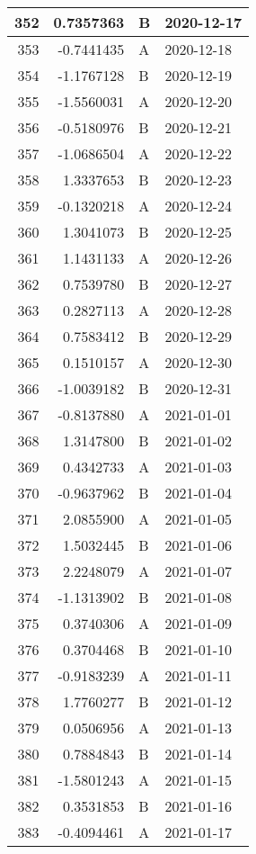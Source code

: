 \begin{tabular}{r|r|l|l}
\hline
352 & 0.7357363 & B & 2020-12-17\\
\hline
353 & -0.7441435 & A & 2020-12-18\\
\hline
354 & -1.1767128 & B & 2020-12-19\\
\hline
355 & -1.5560031 & A & 2020-12-20\\
\hline
356 & -0.5180976 & B & 2020-12-21\\
\hline
357 & -1.0686504 & A & 2020-12-22\\
\hline
358 & 1.3337653 & B & 2020-12-23\\
\hline
359 & -0.1320218 & A & 2020-12-24\\
\hline
360 & 1.3041073 & B & 2020-12-25\\
\hline
361 & 1.1431133 & A & 2020-12-26\\
\hline
362 & 0.7539780 & B & 2020-12-27\\
\hline
363 & 0.2827113 & A & 2020-12-28\\
\hline
364 & 0.7583412 & B & 2020-12-29\\
\hline
365 & 0.1510157 & A & 2020-12-30\\
\hline
366 & -1.0039182 & B & 2020-12-31\\
\hline
367 & -0.8137880 & A & 2021-01-01\\
\hline
368 & 1.3147800 & B & 2021-01-02\\
\hline
369 & 0.4342733 & A & 2021-01-03\\
\hline
370 & -0.9637962 & B & 2021-01-04\\
\hline
371 & 2.0855900 & A & 2021-01-05\\
\hline
372 & 1.5032445 & B & 2021-01-06\\
\hline
373 & 2.2248079 & A & 2021-01-07\\
\hline
374 & -1.1313902 & B & 2021-01-08\\
\hline
375 & 0.3740306 & A & 2021-01-09\\
\hline
376 & 0.3704468 & B & 2021-01-10\\
\hline
377 & -0.9183239 & A & 2021-01-11\\
\hline
378 & 1.7760277 & B & 2021-01-12\\
\hline
379 & 0.0506956 & A & 2021-01-13\\
\hline
380 & 0.7884843 & B & 2021-01-14\\
\hline
381 & -1.5801243 & A & 2021-01-15\\
\hline
382 & 0.3531853 & B & 2021-01-16\\
\hline
383 & -0.4094461 & A & 2021-01-17\\

\end{tabular}
